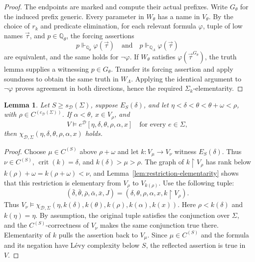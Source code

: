 \documentclass[11pt,a4paper]{amsart}
\newcommand{\restr}{\mathbin{\upharpoonright}}
\newcommand{\crit}{\operatorname{crit}}
\theoremstyle{plain}
\newtheorem{lemma}[theorem]{Lemma}
\theoremstyle{definition}
\theoremstyle{remark}
\begin{document}
\begin{proof}
The endpoints are marked and compute their actual prefixes.
Write $G_\theta$ for the induced prefix generic.
Every parameter in $W_\theta$ has a name in $V_\theta$.
By the choice of $r_k$ and predicate elimination, for each relevant
formula $\varphi$, tuple of low names $\vec\tau$, and
$p\in\mathbb Q_\theta$, the forcing assertions
\[
p\Vdash_{\mathbb Q_\theta}\varphi(\vec\tau)
\quad\text{and}\quad
p\Vdash_{\mathbb Q_\Lambda}\varphi(\vec\tau)
\]
are equivalent, and the same holds for $\neg\varphi$.
If $W_\theta$ satisfies $\varphi(\vec\tau^{G_\theta})$,
the truth lemma supplies a witnessing $p\in G_\theta$.
Transfer its forcing assertion and apply soundness to obtain the
same truth in $W_\Lambda$.
Applying the identical argument to $\neg\varphi$ proves agreement
in both directions, hence the required $\Sigma_k$-elementarity.
\end{proof}

\begin{lemma}\label{lem:finite-reflection}
{Let $S\geq s_{\mathcal D}(\Sigma)$, suppose $E_S(\delta)$, and let $\eta<\delta<\theta<\theta+\omega<\rho$, with $\rho\in C^{(c_{\mathcal D}(\Sigma))}$.  If $\alpha<\theta$, $x\in V_\rho$, and
\[
V\models e^{\mathcal D}
[\eta,\delta,\theta,\rho,\alpha,x]
\quad\text{for every }e\in\Sigma,
\]
then $\chi_{\mathcal D,\Sigma}(\eta,\delta,\theta,\rho,\alpha,x)$ holds.}
\end{lemma}

\begin{proof}
Choose $\mu\in C^{(S)}$ above $\rho+\omega$ and let $k:V_\mu\to V_\nu$ witness $E_S(\delta)$.  Thus $\nu\in C^{(S)}$, $\crit(k)=\delta$, and $k(\delta)>\mu>\rho$.  The graph of $k\restr V_\rho$ has rank below $k(\rho)+\omega=k(\rho+\omega)<\nu$, and Lemma~\ref{lem:restriction-elementarity} shows that this restriction is elementary from $V_\rho$ to $V_{k(\rho)}$.  Use the following tuple:
\[
(\bar\delta,\bar\theta,\bar\rho,\bar\alpha,\bar x,J)
=(\delta,\theta,\rho,\alpha,x,k\restr V_\rho).
\]
Thus $V_\nu\models{\chi_{\mathcal D,\Sigma}}(\eta,k(\delta),k(\theta),k(\rho),k(\alpha),k(x))$.
Here $\rho<k(\delta)$ and $k(\eta)=\eta$.  By assumption, the original tuple satisfies the conjunction over $\Sigma$, and the $C^{(S)}$-correctness of $V_\nu$ makes the same conjunction true there.  Elementarity of $k$ pulls the assertion back to $V_\mu$.  Since $\mu\in C^{(S)}$ and the formula and its negation have L\'evy complexity below $S$, the reflected assertion is true in $V$.
\end{proof}
\end{document}
